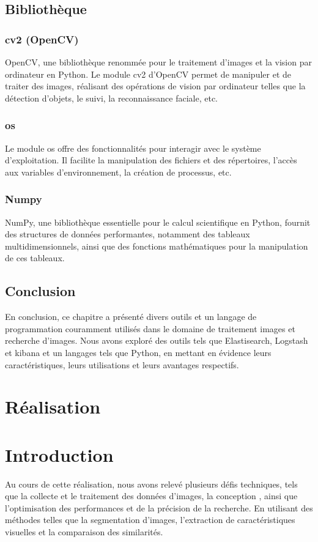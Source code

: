 \documentclass{article}
\begin{document}
	\subsection{Bibliothèque}
	\subsubsection{cv2 (OpenCV) }
	OpenCV, une bibliothèque renommée pour le traitement d'images et la vision par ordinateur en Python. Le module cv2 d'OpenCV permet de manipuler et de traiter des images, réalisant des opérations de vision par ordinateur telles que la détection d'objets, le suivi, la reconnaissance faciale, etc.
	
	\subsubsection{os}
	Le module os offre des fonctionnalités pour interagir avec le système d'exploitation. Il facilite la manipulation des fichiers et des répertoires, l'accès aux variables d'environnement, la création de processus, etc.
	
	\subsubsection{Numpy}
	NumPy, une bibliothèque essentielle pour le calcul scientifique en Python, fournit des structures de données performantes, notamment des tableaux multidimensionnels, ainsi que des fonctions mathématiques pour la manipulation de ces tableaux.
	
	\subsection{Conclusion}
	En conclusion, ce chapitre a présenté divers outils et un langage de programmation couramment
	utilisés dans le domaine de traitement images et recherche d’images. Nous avons exploré des outils
	tels que Elastisearch, Logstash et kibana et un langages tels que Python, en mettant en évidence
	leurs caractéristiques, leurs utilisations et leurs avantages respectifs.
	
	
	\section{Réalisation}
	
	\section{Introduction}
	Au cours de cette réalisation, nous avons relevé plusieurs défis techniques, tels que la collecte
	et le traitement des données d’images, la conception , ainsi que l’optimisation des performances
	et de la précision de la recherche. En utilisant des méthodes telles que la segmentation d’images,
	l’extraction de caractéristiques visuelles et la comparaison des similarités.
	
\end{document}
